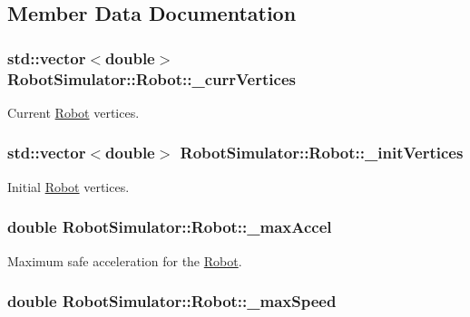 \subsection{Member Data Documentation}
\hypertarget{structRobotSimulator_1_1Robot_acc4b3b442e3739589a5b7a3597988df2}{
\subsubsection[{\-\_\-curr\-Vertices}]{\setlength{\rightskip}{0pt plus 5cm}std\-::vector$<$double$>$ Robot\-Simulator\-::\-Robot\-::\-\_\-curr\-Vertices}}\label{structRobotSimulator_1_1Robot_acc4b3b442e3739589a5b7a3597988df2}
Current \hyperlink{structRobotSimulator_1_1Robot}{Robot} vertices. \hypertarget{structRobotSimulator_1_1Robot_ab7ac2c4dd487006e5e563ad0341808fb}{
\subsubsection[{\-\_\-init\-Vertices}]{\setlength{\rightskip}{0pt plus 5cm}std\-::vector$<$double$>$ Robot\-Simulator\-::\-Robot\-::\-\_\-init\-Vertices}}\label{structRobotSimulator_1_1Robot_ab7ac2c4dd487006e5e563ad0341808fb}
Initial \hyperlink{structRobotSimulator_1_1Robot}{Robot} vertices. \hypertarget{structRobotSimulator_1_1Robot_a34048992e382edb88e15cbee3741e7ed}{
\subsubsection[{\-\_\-max\-Accel}]{\setlength{\rightskip}{0pt plus 5cm}double Robot\-Simulator\-::\-Robot\-::\-\_\-max\-Accel}}\label{structRobotSimulator_1_1Robot_a34048992e382edb88e15cbee3741e7ed}
Maximum safe acceleration for the \hyperlink{structRobotSimulator_1_1Robot}{Robot}. \hypertarget{structRobotSimulator_1_1Robot_a25f9d011ee0c6952950b63405286438b}{
\subsubsection[{\-\_\-max\-Speed}]{\setlength{\rightskip}{0pt plus 5cm}double Robot\-Simulator\-::\-Robot\-::\-\_\-max\-Speed}}\label{structRobotSimulator_1_1Robot_a25f9d011ee0c6952950b63405286438b}
